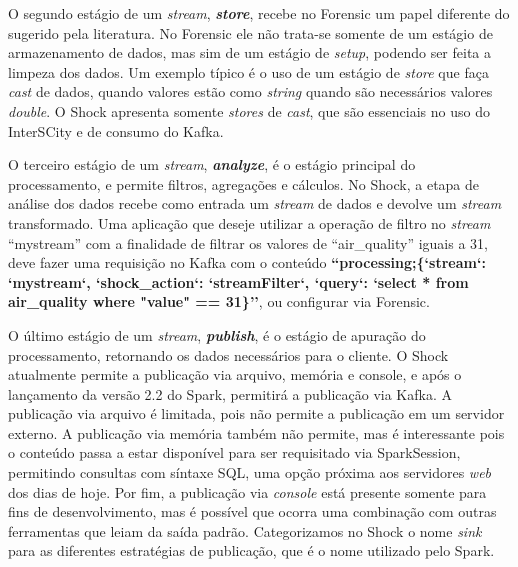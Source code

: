 O segundo estágio de um \textit{stream}, \textit{\textbf{store}}, recebe no
Forensic um papel diferente do sugerido pela literatura. No Forensic
ele não trata-se somente de um estágio de armazenamento de dados, mas sim de um
estágio de \textit{setup}, podendo ser feita a limpeza dos dados. Um
exemplo típico é o uso de um estágio de \textit{store} que faça \textit{cast}
de dados, quando valores estão como \textit{string} quando são necessários valores
\textit{double}. O Shock apresenta somente \textit{stores} de \textit{cast},
que são essenciais no uso do InterSCity e de consumo do Kafka.



O terceiro estágio de um \textit{stream}, \textit{\textbf{analyze}}, é o
estágio principal do processamento, e permite filtros, agregações e cálculos.
No Shock, a etapa de análise dos dados recebe como entrada um \textit{stream}
de dados e devolve um \textit{stream} transformado. Uma aplicação que deseje
utilizar a operação de filtro no \textit{stream} ``mystream'' com a finalidade
de filtrar os valores de ``air\_quality'' iguais a 31, deve fazer uma
requisição no Kafka com o conteúdo \textbf{``processing;\{`stream`: `mystream`,
`shock\_action`: `streamFilter`, `query`: `select * from air\_quality where
"value" == 31\}''}, ou configurar via Forensic.



O último estágio de um \textit{stream}, \textit{\textbf{publish}}, é o estágio
de apuração do processamento, retornando os dados necessários para o cliente.
O Shock atualmente permite a publicação via arquivo, memória e console, e após o
lançamento da versão 2.2 do Spark, permitirá a publicação via Kafka. A
publicação via arquivo é limitada, pois não permite a publicação em um servidor
externo. A publicação via memória também não permite, mas é interessante pois
o conteúdo passa a estar disponível para ser requisitado via SparkSession,
permitindo consultas com síntaxe SQL, uma opção próxima aos servidores
\textit{web} dos dias de hoje. Por fim, a publicação via \textit{console} está
presente somente para fins de desenvolvimento, mas é possível que ocorra uma
combinação com outras ferramentas que leiam da saída padrão. Categorizamos
no Shock o nome \textit{sink} para as diferentes estratégias de publicação,
que é o nome utilizado pelo Spark.

